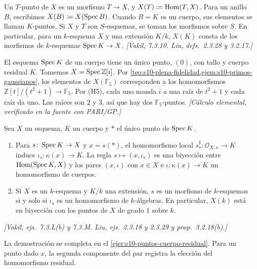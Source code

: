 \begin{defi}
\label{defi:s10-puntos-valores}
Un \(T\)-punto de \(X\) es un morfismo \(T\to X\), y \(X(T)\coloneqq\operatorname{Hom}(T,X)\). Para un anillo \(B\), escribimos \(X(B)\coloneqq X(\operatorname{Spec} B)\). Cuando \(B=K\) es un cuerpo, sus elementos se llaman \(K\)-puntos. Si \(X\) y \(T\) son \(S\)-esquemas, se toman los morfismos sobre \(S\). En particular, para un \(k\)-esquema \(X\) y una extensión \(K/k\), \(X(K)\) consta de los morfismos de \(k\)-esquemas \(\operatorname{Spec} K\to X\). \emph{[Vakil, 7.3.10. Liu, defs.~2.3.28 y 3.2.17.]}
\end{defi}

\begin{ejem}
\label{ejem:s10-primer-conteo}
El esquema \(\operatorname{Spec} K\) de un cuerpo tiene un único punto, \((0)\), con tallo y cuerpo residual \(K\). Tomemos \(X=\operatorname{Spec}\mathbb Z[i]\). Por \cref{teo:s10-plena-fidelidad,ejem:s10-primos-gaussianos}, los elementos de \(X(\mathbb F_5)\) corresponden a los homomorfismos \(\mathbb Z[t]/(t^2+1)\to\mathbb F_5\). Por (H5), cada uno manda \(i\) a una raíz de \(t^2+1\) y cada raíz da uno. Las raíces son \(2\) y \(3\), así que hay dos \(\mathbb F_5\)-puntos. \emph{[Cálculo elemental, verificado en la fuente con PARI/GP.]}
\end{ejem}

\begin{lema}
\label{lema:s10-puntos-cuerpo-residual}
Sea \(X\) un esquema, \(K\) un cuerpo y \(*\) el único punto de \(\operatorname{Spec} K\).
\begin{enumerate}[label=(\alph*)]
\item Para \(s\colon\operatorname{Spec} K\to X\) y \(x=s(*)\), el homomorfismo local \(s_*^\sharp\colon\mathcal O_{X,x}\to K\) induce \(\iota_s\colon\kappa(x)\to K\). La regla \(s\mapsto(x,\iota_s)\) es una biyección entre \(\operatorname{Hom}(\operatorname{Spec} K,X)\) y los pares \((x,\iota)\) con \(x\in X\) e \(\iota\colon\kappa(x)\to K\) un homomorfismo de cuerpos.
\item Si \(X\) es un \(k\)-esquema y \(K/k\) una extensión, \(s\) es un morfismo de \(k\)-esquemas si y solo si \(\iota_s\) es un homomorfismo de \(k\)-álgebras. En particular, \(X(k)\) está en biyección con los puntos de \(X\) de grado \(1\) sobre \(k\).
\end{enumerate}
\emph{[Vakil, ejs.~7.3.L(b) y 7.3.M. Liu, ejs.~2.3.18 y 2.3.29 y prop.~3.2.18(b).]}
\end{lema}
La demostración se completa en el \cref{ejer:s10-puntos-cuerpo-residual}. Para un punto dado \(x\), la segunda componente del par registra la elección del homomorfismo residual.

